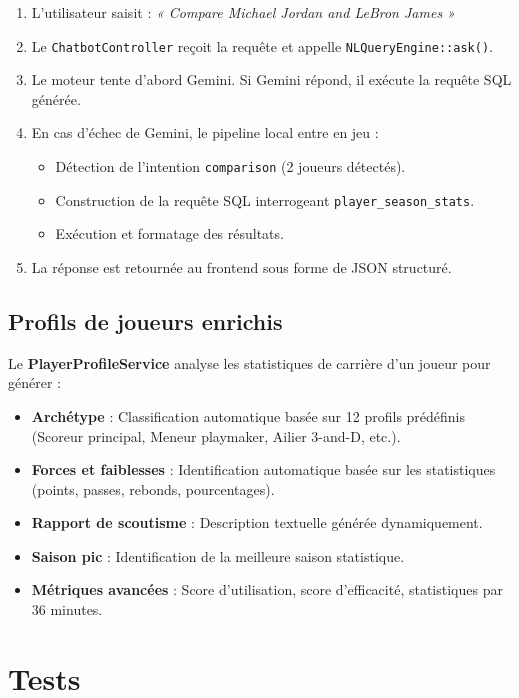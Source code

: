 \documentclass[12pt,a4paper]{report}
\begin{document}
\begin{enumerate}
    \item L'utilisateur saisit : \textit{« Compare Michael Jordan and LeBron James »}
    \item Le \texttt{ChatbotController} reçoit la requête et appelle \texttt{NLQueryEngine::ask()}.
    \item Le moteur tente d'abord Gemini. Si Gemini répond, il exécute la requête SQL générée.
    \item En cas d'échec de Gemini, le pipeline local entre en jeu :
    \begin{itemize}
        \item Détection de l'intention \texttt{comparison} (2 joueurs détectés).
        \item Construction de la requête SQL interrogeant \texttt{player\_season\_stats}.
        \item Exécution et formatage des résultats.
    \end{itemize}
    \item La réponse est retournée au frontend sous forme de JSON structuré.
\end{enumerate}

\subsection{Profils de joueurs enrichis}

Le \textbf{PlayerProfileService} analyse les statistiques de carrière d'un joueur pour générer :

\begin{itemize}
    \item \textbf{Archétype} : Classification automatique basée sur 12 profils prédéfinis (Scoreur principal, Meneur playmaker, Ailier 3-and-D, etc.).
    \item \textbf{Forces et faiblesses} : Identification automatique basée sur les statistiques (points, passes, rebonds, pourcentages).
    \item \textbf{Rapport de scoutisme} : Description textuelle générée dynamiquement.
    \item \textbf{Saison pic} : Identification de la meilleure saison statistique.
    \item \textbf{Métriques avancées} : Score d'utilisation, score d'efficacité, statistiques par 36 minutes.
\end{itemize}

\section{Tests}
\end{document}
